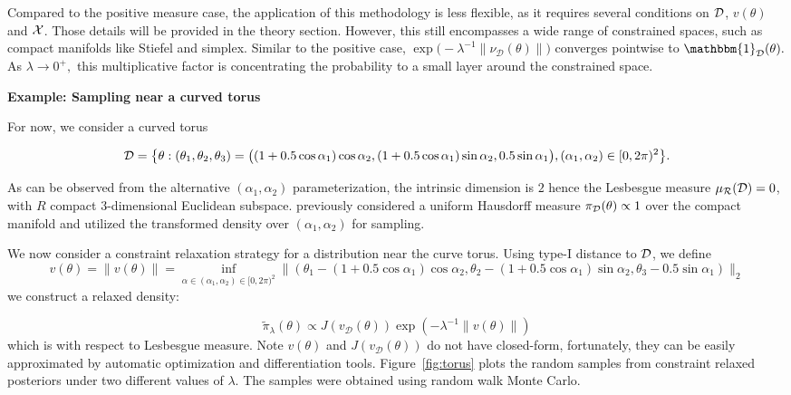 \documentclass[10pt,fleqn]{article}
\DeclareMathOperator{\1}{\mathbbm{1}} \DeclareMathOperator{\bigO}{\mc O}
\begin{document}
Compared to the positive measure case, the application of this methodology is less flexible, as it requires several conditions on $\mathcal{D}$, $v(\theta)$ and $\mathcal{X}$. Those details will be provided in the theory section. However, this still encompasses a wide range of constrained spaces, such as compact manifolds like Stiefel and simplex. Similar to the positive case, $\exp\bigg(-{\lambda^{-1}}\|\nu_\mathcal{D}(\theta)\|\bigg)$ converges
pointwise to $\mathbbm{1}_\mathcal{D}(\theta).$ As $\lambda\to0^+,$ this
multiplicative factor is concentrating the probability to a small layer
around the constrained space. 

\textbf{Example: Sampling near a curved torus}


For now, we consider a curved torus

$$\mathcal{D}= \big\{\theta: (\theta_1,\theta_2,\theta_3) = \big(
(1+ 0.5 \cos\alpha_1) \cos\alpha_2, (1+ 0.5\cos\alpha_1) \sin\alpha_2,0.5 \sin\alpha_1\big), (\alpha_1,\alpha_2)\in [0,2\pi)^2 \big\}.$$

As can be observed from the alternative $(\alpha_1,\alpha_2)$ parameterization, the intrinsic dimension is $2$ hence
 the Lesbesgue measure $\mu_{\mathcal{R}}(\mathcal{D})=0$, with  $R$ compact $3$-dimensional Euclidean subspace. \cite{diaconis2013manifold} previously considered a uniform Hausdorff measure $\pi_{\mathcal{D}}(\theta) \propto 1$ over the compact manifold and utilized the transformed density over $(\alpha_1,\alpha_2)$
for sampling.

We now consider a constraint relaxation strategy for
a distribution near the curve torus.
Using type-I distance to $\mathcal{D}$, we define
$$v(\theta) =\|v(\theta)\|=\underset{\alpha\in  (\alpha_1,\alpha_2)\in [0,2\pi)^2}{\inf} \| (\theta_1-(1+ 0.5\cos\alpha_1) \cos\alpha_2 ,\theta_2 -  (1+ 0.5\cos\alpha_1) \sin\alpha_2,\theta_3
- 0.5\sin\alpha_1)\|_2$$
we construct a relaxed density:

$$\tilde\pi_{\lambda}(\theta) \propto {J(v_\mathcal{D}(\theta))\exp(-\lambda^{-1}\|v(\theta)\|)}$$
which is with respect to Lesbesgue measure. Note $v(\theta)$ and $J(v_\mathcal{D}(\theta))$ do not have closed-form,
fortunately, they can be easily approximated by  automatic optimization and differentiation tools. Figure~\ref{fig:torus}
plots the random samples from constraint relaxed posteriors
under two different values of $\lambda$. The samples
were obtained using random walk Monte Carlo.
\end{document}
